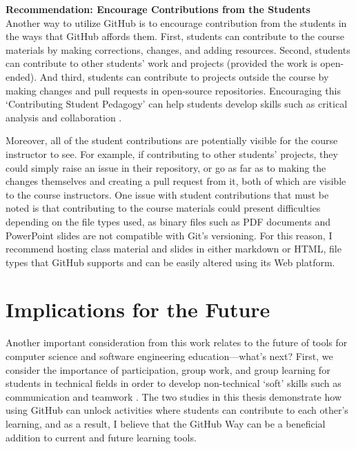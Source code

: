 \textbf{Recommendation: Encourage Contributions from the Students} \\
Another way to utilize GitHub is to encourage contribution from the students in the ways that GitHub affords them. First, students can contribute to the course materials by making corrections, changes, and adding resources. Second, students can contribute to other students' work and projects (provided the work is open-ended). And third, students can contribute to projects outside the course by making changes and pull requests in open-source repositories. Encouraging this `Contributing Student Pedagogy' can help students develop skills such as critical analysis and collaboration \cite{falkner2012supporting}.

Moreover, all of the student contributions are potentially visible for the course instructor to see. For example, if contributing to other students' projects, they could simply raise an issue in their repository, or go as far as to making the changes themselves and creating a pull request from it, both of which are visible to the course instructors. One issue with student contributions that must be noted is that contributing to the course materials could present difficulties depending on the file types used, as binary files such as PDF documents and PowerPoint slides are not compatible with Git's versioning. For this reason, I recommend hosting class material and slides in either markdown or HTML, file types that GitHub supports and can be easily altered using its Web platform.

\section{Implications for the Future}
Another important consideration from this work relates to the future of tools for computer science and software engineering education---what's next? First, we consider the importance of participation, group work, and group learning for students in technical fields in order to develop non-technical `soft' skills such as communication and teamwork \cite{jazayeri2004education}. The two studies in this thesis demonstrate how using GitHub can unlock activities where students can contribute to each other's learning, and as a result, I believe that the GitHub Way can be a beneficial addition to current and future learning tools.

